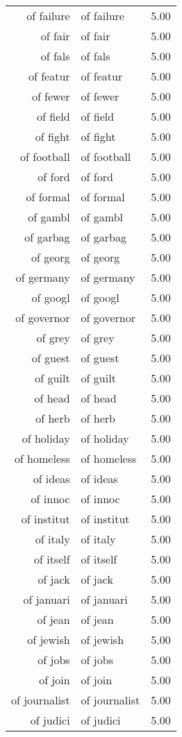 \begin{table}[ht]
\begin{tabular}{rlr}
  of failure & of failure & 5.00 \\ 
  of fair & of fair & 5.00 \\ 
  of fals & of fals & 5.00 \\ 
  of featur & of featur & 5.00 \\ 
  of fewer & of fewer & 5.00 \\ 
  of field & of field & 5.00 \\ 
  of fight & of fight & 5.00 \\ 
  of football & of football & 5.00 \\ 
  of ford & of ford & 5.00 \\ 
  of formal & of formal & 5.00 \\ 
  of gambl & of gambl & 5.00 \\ 
  of garbag & of garbag & 5.00 \\ 
  of georg & of georg & 5.00 \\ 
  of germany & of germany & 5.00 \\ 
  of googl & of googl & 5.00 \\ 
  of governor & of governor & 5.00 \\ 
  of grey & of grey & 5.00 \\ 
  of guest & of guest & 5.00 \\ 
  of guilt & of guilt & 5.00 \\ 
  of head & of head & 5.00 \\ 
  of herb & of herb & 5.00 \\ 
  of holiday & of holiday & 5.00 \\ 
  of homeless & of homeless & 5.00 \\ 
  of ideas & of ideas & 5.00 \\ 
  of innoc & of innoc & 5.00 \\ 
  of institut & of institut & 5.00 \\ 
  of italy & of italy & 5.00 \\ 
  of itself & of itself & 5.00 \\ 
  of jack & of jack & 5.00 \\ 
  of januari & of januari & 5.00 \\ 
  of jean & of jean & 5.00 \\ 
  of jewish & of jewish & 5.00 \\ 
  of jobs & of jobs & 5.00 \\ 
  of join & of join & 5.00 \\ 
  of journalist & of journalist & 5.00 \\ 
  of judici & of judici & 5.00 \\ 

\end{tabular}
\end{table}
